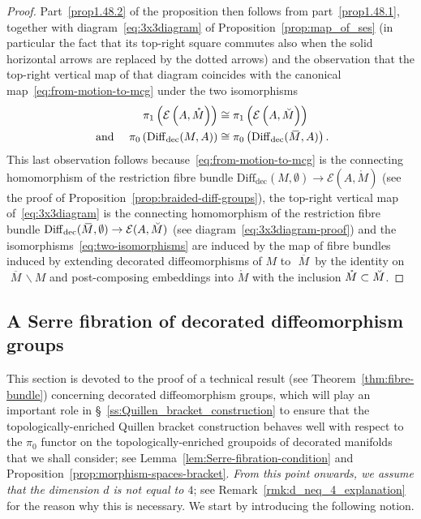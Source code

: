 \documentclass[AHL,Unicode,published]{cedram}
\newcommand{\Int}{\mathring}
\newcommand{\rdec}{\mathrm{dec}}
\newcommand{\mbar}{\ensuremath{{\,\,\overline{\!\! M\!}\,}}}
\newcommand{\cE}{\mathcal{E}}
\newcommand{\diffdec}{\ensuremath{\mathrm{Diff}_{\rdec}}}
\begin{document}
\begin{proof}
Part~\eqref{prop1.48.2} of the proposition then follows from part~\eqref{prop1.48.1}, together with diagram~\eqref{eq:3x3diagram} of Proposition~\ref{prop:map_of_ses} (in particular the fact that its top-right square commutes also when the solid horizontal arrows are replaced by the dotted arrows) and the observation that the top-right vertical map of that diagram coincides with the canonical map~\eqref{eq:from-motion-to-mcg} under the two isomorphisms
\begin{equation}\label{eq:two-isomorphisms}
\begin{split}
\pi_{1}\left(\cE\left(A,\Int{M}\right)\right) &\cong \pi_{1}\left(\cE\left(A,\Breve{M}\right)\right) \\
\text{ and }\quad \pi_{0}\left(\diffdec(M,A)\right) &\cong \pi_{0}\left(\diffdec(\mbar,A)\right).
\end{split}
\end{equation}
This last observation follows because~\eqref{eq:from-motion-to-mcg} is the connecting homomorphism of the restriction fibre bundle $\diffdec(M,\emptyset) \to \cE(A,\Int{M})$ (see the proof of Proposition~\ref{prop:braided-diff-groups}), the top-right vertical map of~\eqref{eq:3x3diagram} is the connecting homomorphism of the restriction fibre bundle $\diffdec(\mbar,\emptyset) \to \cE(A,\Breve{M})$ (see diagram~\eqref{eq:3x3diagram-proof}) and the isomorphisms~\eqref{eq:two-isomorphisms} are induced by the map of fibre bundles induced by extending decorated diffeomorphisms of $M$ to $\mbar$ by the identity on $\mbar \smallsetminus M$ and post-composing embeddings into $\Int{M}$ with the inclusion $\Int{M} \subset \Breve{M}$.
\end{proof}


\subsection{A Serre fibration of decorated diffeomorphism groups}\label{ss:fibration-condition}

This section is devoted to the proof of a technical result (see Theorem~\ref{thm:fibre-bundle}) concerning decorated diffeomorphism groups, which will play an important role in \S~\ref{ss:Quillen_bracket_construction} to ensure that the topologically-enriched Quillen bracket construction behaves well with respect to the $\pi_{0}$ functor on the topologically-enriched groupoids of decorated manifolds that we shall consider; see Lemma~\ref{lem:Serre-fibration-condition} and Proposition~\ref{prop:morphism-spaces-bracket}. \emph{From this point onwards, we assume that the dimension $d$ is not equal to $4$}; see Remark~\ref{rmk:d_neq_4_explanation} for the reason why this is necessary. We start by introducing the following notion.
\end{document}

